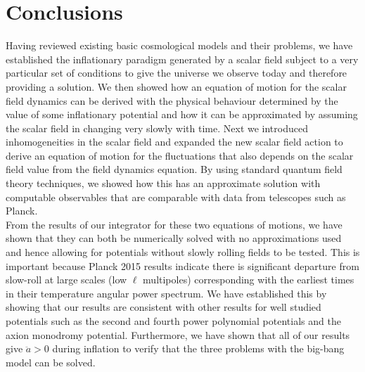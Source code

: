 \documentclass[a4paper,12pt,twoside]{report}
\begin{document}

\chapter{Conclusions}
\label{chap:Conclusions}

Having reviewed existing basic cosmological models and their problems, we have established the inflationary paradigm generated by a scalar field subject to a very particular set of conditions to give the universe we observe today and therefore providing a solution. We then showed how an equation of motion for the scalar field dynamics can be derived with the physical behaviour determined by the value of some inflationary potential and how it can be approximated by assuming the scalar field in changing very slowly with time. Next we introduced inhomogeneities in the scalar field and expanded the new scalar field action to derive an equation of motion for the fluctuations that also depends on the scalar field value from the field dynamics equation. By using standard quantum field theory techniques, we showed how this has an approximate solution with computable observables that are comparable with data from telescopes such as Planck.
\\[10pt]
From the results of our integrator for these two equations of motions, we have shown that they can both be numerically solved with no approximations used and hence allowing for potentials without slowly rolling fields to be tested. This is important because Planck 2015 results indicate there is significant departure from slow-roll at large scales (low $\ell$ multipoles) corresponding with the earliest times in their temperature angular power spectrum. We have established this by showing that our results are consistent with other results for well studied potentials such as the second and fourth power polynomial potentials and the axion monodromy potential. Furthermore, we have shown that all of our results give $\ddot{a} > 0$ during inflation to verify that the three problems with the big-bang model can be solved.
\\[10pt]
\end{document}
